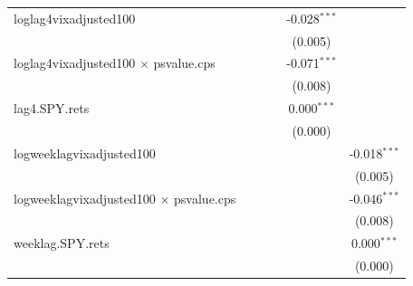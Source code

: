 \documentclass[11pt,a4paper,oldfontcommands]{memoir}
\begin{document}
{\begin{footnotesize}
\begin{longtable}{l*{5}{c}}
loglag4vixadjusted100&                     &                     &                     &      -0.028$^{***}$&                     \\
                    &                     &                     &                     &     (0.005)         &                     \\
 
loglag4vixadjusted100 $\times$ psvalue.cps&                     &                     &                     &      -0.071$^{***}$&                     \\
                    &                     &                     &                     &     (0.008)         &                     \\
 
lag4.SPY.rets       &                     &                     &                     &       0.000$^{***}$&                     \\
                    &                     &                     &                     &     (0.000)         &                     \\
 
logweeklagvixadjusted100&                     &                     &                     &                     &      -0.018$^{***}$\\
                    &                     &                     &                     &                     &     (0.005)         \\
 
logweeklagvixadjusted100 $\times$ psvalue.cps&                     &                     &                     &                     &      -0.046$^{***}$\\
                    &                     &                     &                     &                     &     (0.008)         \\
 
weeklag.SPY.rets    &                     &                     &                     &                     &       0.000$^{***}$\\
                    &                     &                     &                     &                     &     (0.000)         \\


\end{longtable}
\end{footnotesize}}
\end{document}
